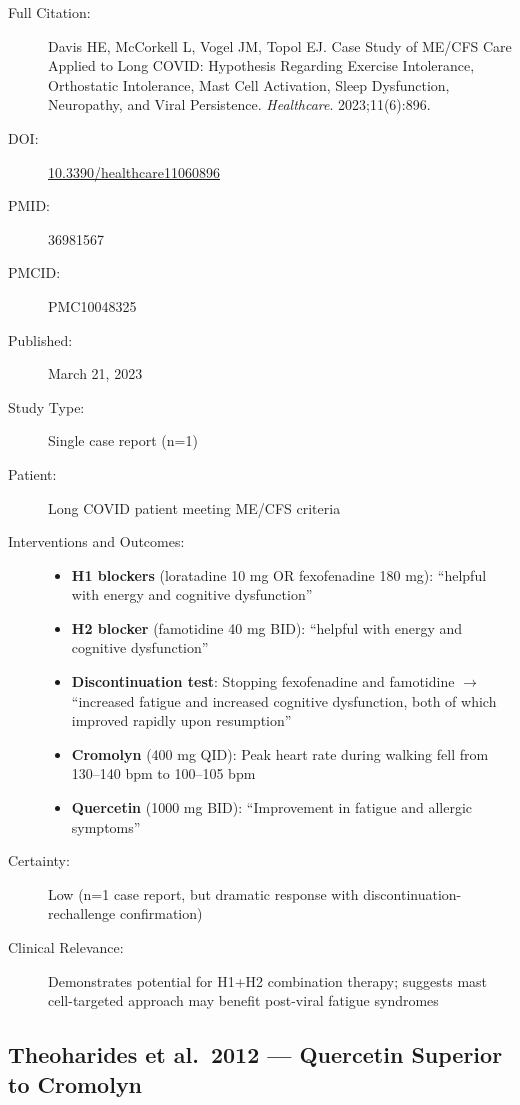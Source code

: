 \begin{description}
    \item[Full Citation:] Davis HE, McCorkell L, Vogel JM, Topol EJ. Case Study of ME/CFS Care Applied to Long COVID: Hypothesis Regarding Exercise Intolerance, Orthostatic Intolerance, Mast Cell Activation, Sleep Dysfunction, Neuropathy, and Viral Persistence. \textit{Healthcare}. 2023;11(6):896.
    \item[DOI:] \href{https://doi.org/10.3390/healthcare11060896}{10.3390/healthcare11060896}
    \item[PMID:] 36981567
    \item[PMCID:] PMC10048325
    \item[Published:] March 21, 2023
    \item[Study Type:] Single case report (n=1)
    \item[Patient:] Long COVID patient meeting ME/CFS criteria
    \item[Interventions and Outcomes:]
    \begin{itemize}
        \item \textbf{H1 blockers} (loratadine 10 mg OR fexofenadine 180 mg): ``helpful with energy and cognitive dysfunction''
        \item \textbf{H2 blocker} (famotidine 40 mg BID): ``helpful with energy and cognitive dysfunction''
        \item \textbf{Discontinuation test}: Stopping fexofenadine and famotidine $\rightarrow$ ``increased fatigue and increased cognitive dysfunction, both of which improved rapidly upon resumption''
        \item \textbf{Cromolyn} (400 mg QID): Peak heart rate during walking fell from 130--140 bpm to 100--105 bpm
        \item \textbf{Quercetin} (1000 mg BID): ``Improvement in fatigue and allergic symptoms''
    \end{itemize}
    \item[Certainty:] Low (n=1 case report, but dramatic response with discontinuation-rechallenge confirmation)
    \item[Clinical Relevance:] Demonstrates potential for H1+H2 combination therapy; suggests mast cell-targeted approach may benefit post-viral fatigue syndromes
\end{description}

\subsection{Theoharides et al.\ 2012 --- Quercetin Superior to Cromolyn}

